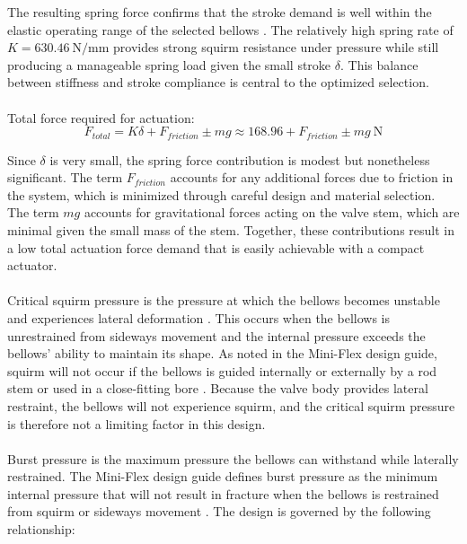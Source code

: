 \documentclass[12pt, letterpaper]{report}%
\begin{document}
            The resulting spring force confirms that the stroke demand is well within the elastic operating 
            range of the selected bellows \cite{miniflex_design}.
            The relatively high spring rate of $K = 630.46\ \text{N/mm}$ provides strong squirm resistance 
            under pressure while still producing a manageable spring load given the small stroke $\delta$.
            This balance between stiffness and stroke compliance is central to the optimized selection.
            \\~\\
            Total force required for actuation:
            \begin{equation}
            F_{total} = K \delta + F_{friction} \pm mg \approx 168.96 + F_{friction} \pm mg \ \text{N}
            \label{force_total}
            \end{equation}

            Since $\delta$ is very small, the spring force contribution is modest but nonetheless significant. 
            The term $F_{friction}$ accounts for any additional forces due to friction in the system, which 
            is minimized through careful design and material selection.
            The term $mg$ accounts for gravitational forces acting on the valve stem, which are minimal given 
            the small mass of the stem.
            Together, these contributions result in a low total actuation force demand that is easily 
            achievable with a compact actuator.
            \\~\\
            Critical squirm pressure is the pressure at which the bellows becomes unstable and experiences 
            lateral deformation \cite{miniflex_design}.
            This occurs when the bellows is unrestrained from sideways movement and the internal pressure 
            exceeds the bellows' ability to maintain its shape.
            As noted in the Mini-Flex design guide, squirm will not occur if the bellows is guided internally 
            or externally by a rod stem or used in a close-fitting bore \cite{miniflex_design}.
            Because the valve body provides lateral restraint, the bellows will not experience squirm, and 
            the critical squirm pressure is therefore not a limiting factor in this design.
            \\~\\
            Burst pressure is the maximum pressure the bellows can withstand while laterally restrained.
            The Mini-Flex design guide defines burst pressure as the minimum internal pressure that will not 
            result in fracture when the bellows is restrained from squirm or sideways movement \cite{miniflex_design}.
            The design is governed by the following relationship:
\end{document}
